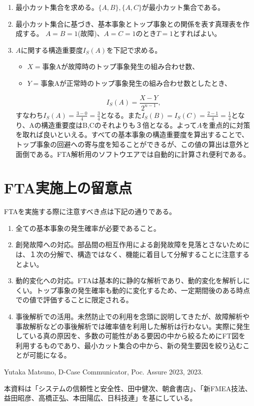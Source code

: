 \begin{enumerate}
\item 最小カット集合を求める。$\{A,B\},\{A,C\}$が最小カット集合である。
\item 最小カット集合に基づき、基本事象とトップ事象との関係を表す真理表を作成する。
$A=B=1$(故障)、$A=C=1$のとき$T=1$とすればよい。
\item $A$に関する構造重要度$I_S(A)$を下記で求める。
\begin{itemize}
\item $X=$事象Aが故障時のトップ事象発生の組み合わせ数、
\item $Y=$事象Aが正常時のトップ事象発生の組み合わせ数としたとき、
\end{itemize}
\[I_S(A) = \frac{X-Y}{2^{n-1}},\]
すなわち$I_S(A)=\frac{3-0}{4}=\frac{3}{4}$となる。また$I_S(B)=I_S(C)=\frac{2-1}{4}=\frac{1}{4}$となり、Aの構造重要度はB,Cのそれよりも３倍となる。よって$A$を重点的に対策を取れば良いといえる。すべての基本事象の構造重要度を算出することで、トップ事象の回避への寄与度を知ることができるが、この値の算出は意外と面倒である。FTA解析用のソフトウエアでは自動的に計算され便利である。
\end{enumerate}
\section{FTA実施上の留意点}
FTAを実施する際に注意すべき点は下記の通りである。
\begin{enumerate}
\item 全ての基本事象の発生確率が必要であること。
\item 創発故障への対応。部品間の相互作用による創発故障を見落とさないためには、１次の分解で、構造ではなく、機能に着目して分解することに注意するとよい。
\item 動的変化への対応。FTAは基本的に静的な解析であり、動的変化を解析しにくい。トップ事象の発生確率も動的に変化するため、一定期間後のある時点での値で評価することに限定される。
\item 事後解析での活用。未然防止での利用を念頭に説明してきたが、故障解析や事故解析などの事後解析では確率値を利用した解析は行わない。実際に発生している真の原因を、多数の可能性がある要因の中から絞るためにFT図を利用するものであり、最小カット集合の中から、新の発生要因を絞り込むことが可能になる。
\end{enumerate}


\begin{thebibliography*}{9}
Yutaka Matsuno, D-Case Communicator, Poc. Assure 2023, 2023.

\end{thebibliography*}

本資料は「システムの信頼性と安全性、田中健次、朝倉書店」、「新FMEA技法、益田昭彦、高橋正弘、本田陽広、日科技連」を基にしている。
